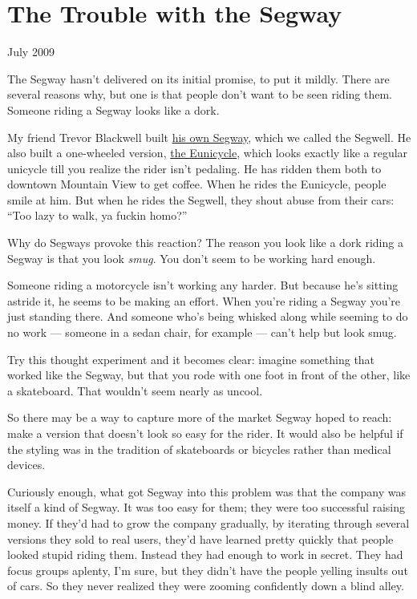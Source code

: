 \chapter{The Trouble with the Segway}

July 2009

The Segway hasn't delivered on its initial promise, to put it mildly.
There are several reasons why, but one is that people don't want to be
seen riding them. Someone riding a Segway looks like a dork.

My friend Trevor Blackwell built \href{http://tlb.org/\#scooter}{his own
Segway}, which we called the Segwell. He also built a one-wheeled
version, \href{http://tlb.org/\#eunicycle}{the Eunicycle}, which looks
exactly like a regular unicycle till you realize the rider isn't
pedaling. He has ridden them both to downtown Mountain View to get
coffee. When he rides the Eunicycle, people smile at him. But when he
rides the Segwell, they shout abuse from their cars: ``Too lazy to walk,
ya fuckin homo?''

Why do Segways provoke this reaction? The reason you look like a dork
riding a Segway is that you look \emph{smug}. You don't seem to be
working hard enough.

Someone riding a motorcycle isn't working any harder. But because he's
sitting astride it, he seems to be making an effort. When you're riding
a Segway you're just standing there. And someone who's being whisked
along while seeming to do no work --- someone in a sedan chair, for
example --- can't help but look smug.

Try this thought experiment and it becomes clear: imagine something that
worked like the Segway, but that you rode with one foot in front of the
other, like a skateboard. That wouldn't seem nearly as uncool.

So there may be a way to capture more of the market Segway hoped to
reach: make a version that doesn't look so easy for the rider. It would
also be helpful if the styling was in the tradition of skateboards or
bicycles rather than medical devices.

Curiously enough, what got Segway into this problem was that the company
was itself a kind of Segway. It was too easy for them; they were too
successful raising money. If they'd had to grow the company gradually,
by iterating through several versions they sold to real users, they'd
have learned pretty quickly that people looked stupid riding them.
Instead they had enough to work in secret. They had focus groups
aplenty, I'm sure, but they didn't have the people yelling insults out
of cars. So they never realized they were zooming confidently down a
blind alley.